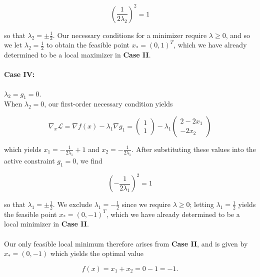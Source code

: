 \begin{solution}
    $$
    \left( \frac{1}{2 \lambda_2} \right)^2 = 1
    $$

    so that $\lambda_2 = \pm \frac{1}{2}$. Our necessary conditions for a minimizer require $\lambda \ge 0$, and so we 
    let $\lambda_2 = \frac{1}{2}$ to obtain the feasible point $x_* = (0, 1)^T$, which we have already determined to be 
    a local maximizer in \textbf{Case II}.

    \paragraph{Case IV:} $\lambda_2 = g_1 = 0.$ \ \\
    When $\lambda_2 = 0$, our first-order necessary condition yields

    $$
    \nabla_x \mathcal{L} = \nabla f(x) - \lambda_1 \nabla g_1 = \begin{pmatrix*}
        1 \\
        1
    \end{pmatrix*} - \lambda_1 \begin{pmatrix*}
        2 - 2 x_1 \\
        -2 x_2
    \end{pmatrix*}
    $$

    which yields $x_1 = -\frac{1}{2 \lambda_1} + 1$ and $x_2 = -\frac{1}{2 \lambda_1}$. After substituting these values 
    into the active constraint $g_1 = 0$, we find

    $$
    \left( -\frac{1}{2 \lambda_1} \right)^2 = 1
    $$

    so that $\lambda_1 = \pm \frac{1}{2}$. We exclude $\lambda_1 = -\frac{1}{2}$ since we require $\lambda \ge 0$; 
    letting $\lambda_1 = \frac{1}{2}$ yields the feasible point $x_* = (0, -1)^T$, which we have already determined to 
    be a local minimizer in \textbf{Case II}.
    \ \\\\
    Our only feasible local minimum therefore arises from \textbf{Case II}, and is given by $x_* = (0, -1)$ which yields
    the optimal value

    $$
    f(x) = x_1 + x_2 = 0 - 1 = -1.
    $$
    \ \\
\end{solution}